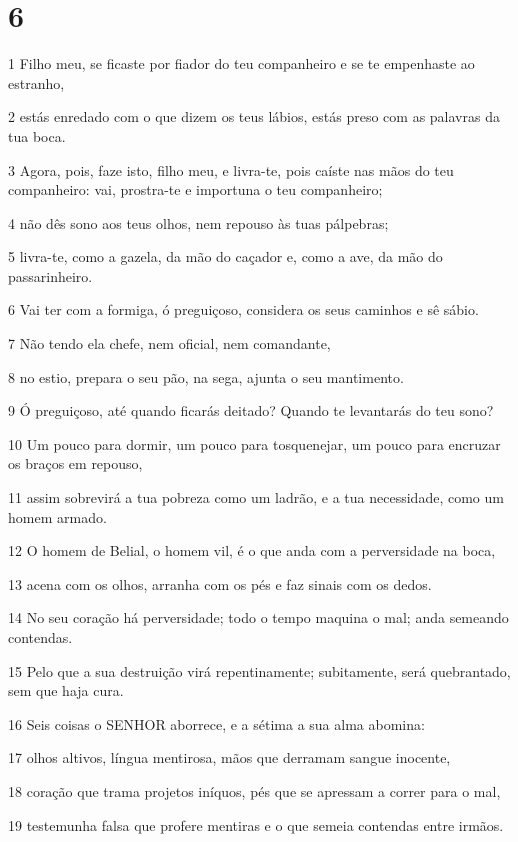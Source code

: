 \chapter{6}

\par 1 Filho meu, se ficaste por fiador do teu companheiro e se te empenhaste ao estranho,
\par 2 estás enredado com o que dizem os teus lábios, estás preso com as palavras da tua boca.
\par 3 Agora, pois, faze isto, filho meu, e livra-te, pois caíste nas mãos do teu companheiro: vai, prostra-te e importuna o teu companheiro;
\par 4 não dês sono aos teus olhos, nem repouso às tuas pálpebras;
\par 5 livra-te, como a gazela, da mão do caçador e, como a ave, da mão do passarinheiro.
\par 6 Vai ter com a formiga, ó preguiçoso, considera os seus caminhos e sê sábio.
\par 7 Não tendo ela chefe, nem oficial, nem comandante,
\par 8 no estio, prepara o seu pão, na sega, ajunta o seu mantimento.
\par 9 Ó preguiçoso, até quando ficarás deitado? Quando te levantarás do teu sono?
\par 10 Um pouco para dormir, um pouco para tosquenejar, um pouco para encruzar os braços em repouso,
\par 11 assim sobrevirá a tua pobreza como um ladrão, e a tua necessidade, como um homem armado.
\par 12 O homem de Belial, o homem vil, é o que anda com a perversidade na boca,
\par 13 acena com os olhos, arranha com os pés e faz sinais com os dedos.
\par 14 No seu coração há perversidade; todo o tempo maquina o mal; anda semeando contendas.
\par 15 Pelo que a sua destruição virá repentinamente; subitamente, será quebrantado, sem que haja cura.
\par 16 Seis coisas o SENHOR aborrece, e a sétima a sua alma abomina:
\par 17 olhos altivos, língua mentirosa, mãos que derramam sangue inocente,
\par 18 coração que trama projetos iníquos, pés que se apressam a correr para o mal,
\par 19 testemunha falsa que profere mentiras e o que semeia contendas entre irmãos.
